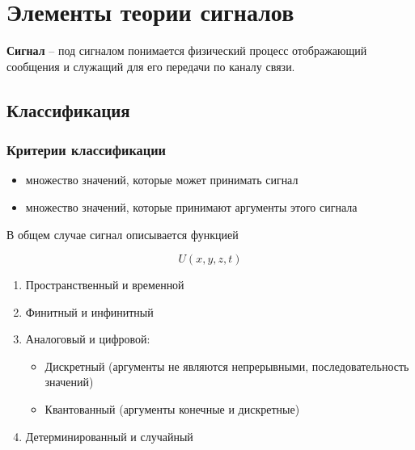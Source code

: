 \section{Элементы теории сигналов}

\textbf{Сигнал} -- под сигналом понимается физический процесс отображающий сообщения и служащий для его передачи по каналу связи.

\subsection{Классификация}

\subsubsection{Критерии классификации}

\begin{itemize}
    \item множество значений, которые может принимать сигнал
    \item множество значений, которые принимают аргументы этого сигнала
\end{itemize}

В общем случае сигнал описывается функцией

\begin{equation*}
    U(x, y, z, t)
\end{equation*}

\begin{enumerate}
    \item Пространственный и временной
    \item Финитный и инфинитный
    \item Аналоговый и цифровой:

        \begin{itemize}
            \item Дискретный (аргументы не являются непрерывными, последовательность значений)
            \item Квантованный (аргументы конечные и дискретные)
        \end{itemize}

    \item Детерминированный и случайный
\end{enumerate}

